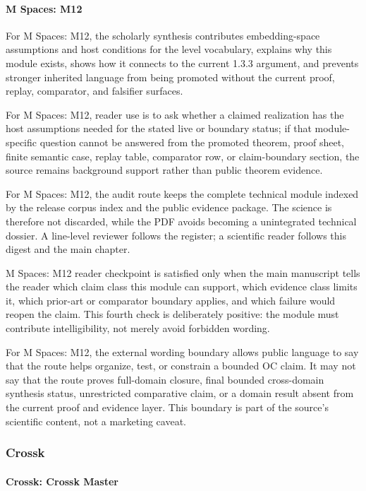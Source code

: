 \paragraph{M Spaces: M12}

For M Spaces: M12, the scholarly synthesis contributes embedding-space assumptions and host conditions for the level vocabulary, explains why this module exists, shows how it connects to the current 1.3.3 argument, and prevents stronger inherited language from being promoted without the current proof, replay, comparator, and falsifier surfaces.


For M Spaces: M12, reader use is to ask whether a claimed realization has the host assumptions needed for the stated live or boundary status; if that module-specific question cannot be answered from the promoted theorem, proof sheet, finite semantic case, replay table, comparator row, or claim-boundary section, the source remains background support rather than public theorem evidence.


For M Spaces: M12, the audit route keeps the complete technical module indexed by the release corpus index and the public evidence package. The science is therefore not discarded, while the PDF avoids becoming a unintegrated technical dossier. A line-level reviewer follows the register; a scientific reader follows this digest and the main chapter.


M Spaces: M12 reader checkpoint is satisfied only when the main manuscript tells the reader which claim class this module can support, which evidence class limits it, which prior-art or comparator boundary applies, and which failure would reopen the claim. This fourth check is deliberately positive: the module must contribute intelligibility, not merely avoid forbidden wording.


For M Spaces: M12, the external wording boundary allows public language to say that the route helps organize, test, or constrain a bounded OC claim. It may not say that the route proves full-domain closure, final bounded cross-domain synthesis status, unrestricted comparative claim, or a domain result absent from the current proof and evidence layer. This boundary is part of the source's scientific content, not a marketing caveat.


\subsubsection{Crossk}

\paragraph{Crossk: Crossk Master}

